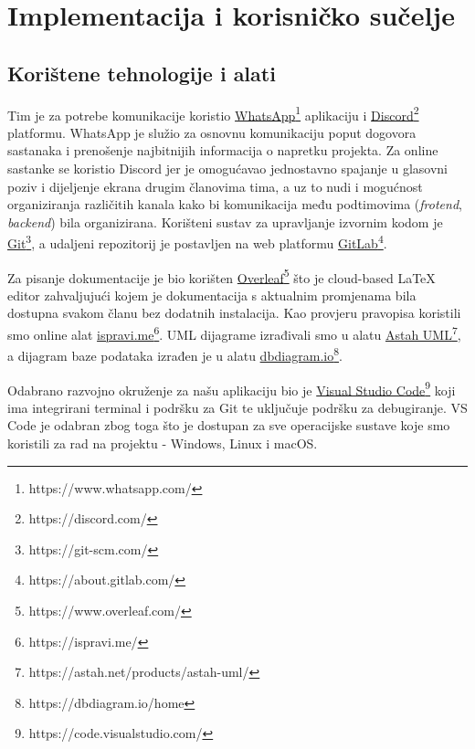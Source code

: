 \chapter{Implementacija i korisničko sučelje}
		
		
		\section{Korištene tehnologije i alati}
		
			 
			 Tim je za potrebe komunikacije koristio \underline{WhatsApp}\footnote{https://www.whatsapp.com/} aplikaciju i \underline{Discord}\footnote{https://discord.com/} platformu. WhatsApp je služio za osnovnu komunikaciju poput dogovora sastanaka i prenošenje najbitnijih informacija o napretku projekta. Za online sastanke se koristio Discord jer je omogućavao jednostavno spajanje u glasovni poziv i dijeljenje ekrana drugim članovima tima, a uz to nudi i mogućnost organiziranja različitih kanala kako bi komunikacija među podtimovima (\textit{frotend}, \textit{backend}) bila organizirana. Korišteni sustav za upravljanje izvornim kodom je \underline{Git}\footnote{https://git-scm.com/}, a udaljeni repozitorij je postavljen na web platformu \underline{GitLab}\footnote{https://about.gitlab.com/}. \par
			 
			 Za pisanje dokumentacije je bio korišten \underline{Overleaf}\footnote{https://www.overleaf.com/} što je cloud-based LaTeX editor zahvaljujući kojem je dokumentacija s aktualnim promjenama bila dostupna svakom članu bez dodatnih instalacija. Kao provjeru pravopisa koristili smo online alat \underline{ispravi.me}\footnote{https://ispravi.me/}. UML dijagrame izrađivali smo u alatu \underline{Astah UML}\footnote{https://astah.net/products/astah-uml/}, a dijagram baze podataka izrađen je u alatu \underline{dbdiagram.io}\footnote{https://dbdiagram.io/home}. \par
			 
			 Odabrano razvojno okruženje za našu aplikaciju bio je \underline{Visual Studio Code}\footnote{https://code.visualstudio.com/} koji ima integrirani terminal i podršku za Git te uključuje podršku za debugiranje. VS Code je odabran zbog toga što je dostupan za sve operacijske sustave koje smo koristili za rad na projektu - Windows, Linux i macOS. \par
			 
